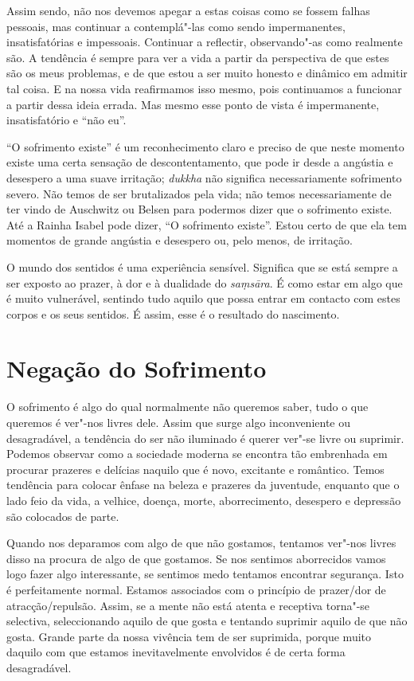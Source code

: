 Assim sendo, não nos devemos apegar a estas coisas como se fossem falhas
pessoais, mas continuar a contemplá"-las como sendo impermanentes,
insatisfatórias e impessoais. Continuar a reflectir, observando"-as como
realmente são. A tendência é sempre para ver a vida a partir da perspectiva de
que estes são os meus problemas, e de que estou a ser muito honesto e dinâmico
em admitir tal coisa. E na nossa vida reafirmamos isso mesmo, pois continuamos a
funcionar a partir dessa ideia errada. Mas mesmo esse ponto de vista é
impermanente, insatisfatório e “não eu”.

“O sofrimento existe” é um reconhecimento claro e preciso de que neste momento
existe uma certa sensação de descontentamento, que pode ir desde a angústia e
desespero a uma suave irritação; \emph{dukkha} não significa necessariamente
sofrimento severo. Não temos de ser brutalizados pela vida; não temos
necessariamente de ter vindo de Auschwitz ou Belsen para podermos dizer que o
sofrimento existe. Até a Rainha Isabel pode dizer, “O sofrimento existe”.
Estou certo de que ela tem momentos de grande angústia e desespero ou, pelo
menos, de irritação.

O mundo dos sentidos é uma experiência sensível. Significa que se está sempre a
ser exposto ao prazer, à dor e à dualidade do \emph{saṃsāra}. É como estar em
algo que é muito vulnerável, sentindo tudo aquilo que possa entrar em contacto
com estes corpos e os seus sentidos. É assim, esse é o resultado do nascimento.

\section{Negação do Sofrimento}

O sofrimento é algo do qual normalmente não queremos saber, tudo o que queremos é
ver"-nos livres dele. Assim que surge algo inconveniente ou desagradável, a
tendência do ser não iluminado é querer ver"-se livre ou suprimir. Podemos
observar como a sociedade moderna se encontra tão embrenhada em procurar
prazeres e delícias naquilo que é novo, excitante e \mbox{romântico}. Temos tendência para
colocar ênfase na beleza e prazeres da juventude, enquanto que o lado feio da
vida, a velhice, doença, morte, aborrecimento, desespero e depressão são
colocados de parte.

Quando nos deparamos com algo de que não gostamos, tentamos
ver"-nos livres disso na procura de algo de que gostamos. Se nos sentimos
aborrecidos vamos logo fazer algo interessante, se sentimos medo tentamos
encontrar segurança. Isto é perfeitamente normal. Estamos associados com o
princípio de prazer/dor de atracção/repulsão. Assim, se a mente não está atenta
e receptiva torna"-se selectiva, seleccionando aquilo de que gosta e tentando
suprimir aquilo de que não gosta. Grande parte da nossa vivência tem de ser
suprimida, porque muito daquilo com que estamos inevitavelmente envolvidos é de
certa forma desagradável.

